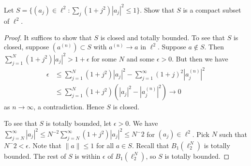 \documentclass{article}
\begin{document}
 Let $S = \{ (a_j) \in \ell^2 : \sum_j (1+j^2)|a_j|^2 \le 1 \}$. Show that $S$ is a compact subset of $\ell^2$.
\begin{proof}
It suffices to show that $S$ is closed and totally bounded. To see that $S$ is closed, suppose $(a^(n)) \subset S$ with $a^(n) \to a$ in $\ell^2$.  Suppose $a \not\in S$.   Then  $\sum_{j = 1}^N (1+j^2) |a_j|^2 > 1 + \epsilon$ for some $N$ and some $\epsilon > 0$.  But then we have
\begin{align*}
\epsilon & \le \sum_{j=1}^N (1 + j^2) |a_j|^2 - \sum_{j=1}^\infty (1+j)^2 |a^{(n)}_j|^2
\\ & \le \sum_{j=1}^N (1 + j^2) (|a_j|^2 - |a^{(n)}_j|^2)
\to 0
\end{align*}
as $n \to \infty$, a contradiction.  Hence $S$ is closed.

To see that $S$ is totally bounded, let $\epsilon > 0$.  We have $\sum_{j=N}^\infty |a_j|^2 \le N^{-2} \sum_{j=N}^\infty (1 + j^2) |a_j|^2 \le N^-2$ for $(a_j) \in \ell^2$.  Pick $N$ such that $N^-2 < \epsilon$.  Note that $\|a\| \le 1$ for all $a \in S$.  Recall that $B_1(\ell_2^N)$ is totally bounded.  The rest of $S$ is within $\epsilon$ of $B_1(\ell_2^N)$, so $S$ is totally bounded.
\end{proof}
\end{document}
